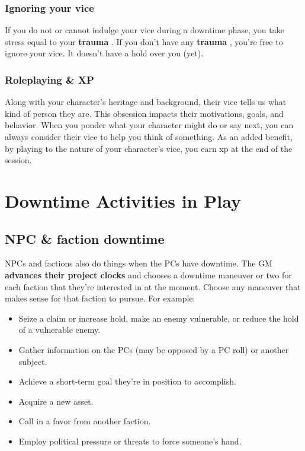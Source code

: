 \documentclass[11pt,oneside]{book}
\newcommand{\gameterm}[1]{\textbf{#1}}
\begin{document}
\subsection{Ignoring your vice}

If you do not or cannot indulge your vice during a downtime phase, you take stress equal to your \gameterm{trauma} . If you don’t have any \gameterm{trauma} , you’re free to ignore your vice. It doesn’t have a hold over you (yet).

\subsection{Roleplaying \& XP}

Along with your character’s heritage and background, their vice tells us what kind of person they are. This obsession impacts their motivations, goals, and behavior. When you ponder what your character might do or say next, you can always consider their vice to help you think of something. As an added benefit, by playing to the nature of your character’s vice, you earn xp at the end of the session.

\chapter{Downtime Activities in Play}

\section{NPC \& faction downtime}

NPCs and factions also do things when the PCs have downtime. The GM \textbf{advances their project clocks} and chooses a downtime maneuver or two for each faction that they’re interested in at the moment. Choose any maneuver that makes sense for that faction to pursue. For example:

\begin{itemize}
	\item Seize a claim or increase hold, make an enemy vulnerable, or reduce the hold of a vulnerable enemy.
	\item Gather information on the PCs (may be opposed by a PC roll) or another subject.
	\item Achieve a short-term goal they’re in position to accomplish.
	\item Acquire a new asset.
	\item Call in a favor from another faction.
	\item Employ political pressure or threats to force someone’s hand.
\end{itemize}
\end{document}
